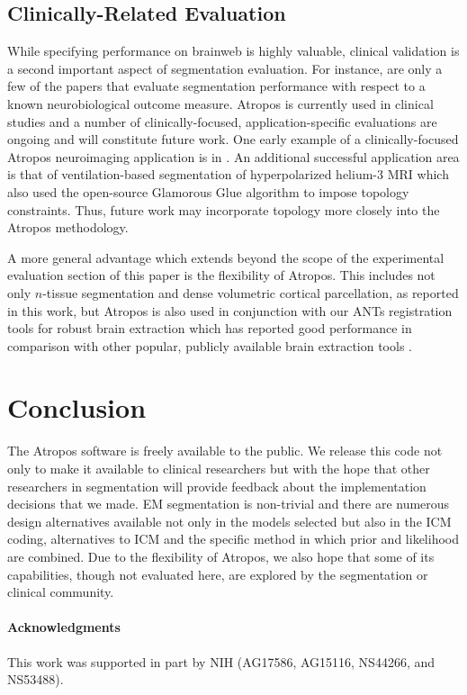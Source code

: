 \documentclass[11pt,english]{article}
\begin{document}
\subsection{Clinically-Related Evaluation}
While specifying performance on brainweb is highly
valuable, clinical validation is a second important aspect of
segmentation evaluation.  For instance, 
\citep{Freeborough1997,Westlye2009,Sanchez-Benavides2010,Chou2009,Bresser2011}
are only a few of the papers that evaluate segmentation performance with
respect to a known neurobiological outcome measure.  Atropos is
currently used in clinical studies and a number of clinically-focused,
application-specific evaluations are ongoing and will constitute
future work.  One early example of a clinically-focused Atropos
neuroimaging application is in \citep{Avants2010c}.  An additional successful
application area is that of ventilation-based segmentation of hyperpolarized helium-3 MRI
\citep{Tustison2010a} which also used the open-source  Glamorous Glue
algorithm to impose topology constraints.  Thus, future work may
incorporate topology more closely into the Atropos methodology.  

A more general advantage which extends beyond the scope of the experimental 
evaluation section of this paper is the flexibility of Atropos.   This includes 
not only $n$-tissue segmentation and dense volumetric cortical parcellation,
as reported in this work, but Atropos is also used in conjunction with our ANTs registration tools for robust
brain extraction which has reported good performance in comparison with other
popular, publicly available brain extraction tools \citep{Avants2010a}.  
 
\section{Conclusion}
The Atropos software is freely available to the public.  We release
this code not only to make it available to clinical researchers but
with the hope that other researchers in segmentation will provide
feedback about the implementation decisions that we made.  EM
segmentation is non-trivial and there are numerous design alternatives
available not only in the models selected but also in the ICM coding, alternatives to ICM and the specific method in which prior
and likelihood are combined.  Due to the flexibility of Atropos, we
also hope that some of its capabilities, though not evaluated here,
are explored by the segmentation or clinical community.

\paragraph{Acknowledgments}
{This work was supported in part by NIH (AG17586, AG15116, NS44266, and
NS53488).}

\newpage


 
\end{document}
